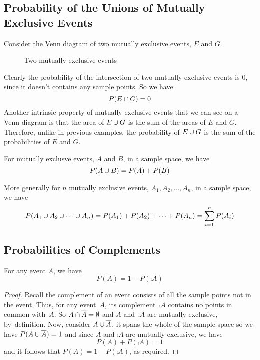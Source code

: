 \subsection*{Probability of the Unions of Mutually Exclusive Events}
Consider the Venn diagram of two mutually exclusive events, $E$ and $G$.
\begin{figure}[htp]
\centering
{}
\caption{Two mutually exclusive events} \label{fig:Two mutually exclusive events}
\end{figure}
Clearly the probability of the intersection of two mutually exclusive events is 0, since it doesn't contains any sample points. So we have 
\[
    P(E \cap G) = 0    
\]
Another intrinsic property of mutually exclusive events that we can see on a Venn diagram is that the area of $E \cup G$ is the sum of the areas of $E$ and $G$. Therefore, unlike in previous examples, the probability of $E \cup G$ is the sum of the probabilities of $E$ and $G$.
\begin{theorem}
For mutually exclusve events, $A$ and $B$, in a sample space, we have
\[
    P(A \cup B) = P(A) + P(B)
\]
\end{theorem}
\begin{theorem}
More generally for $n$ mutually exclusive events, $A_1,A_2,\ldots,A_n$, in a sample space, we have
\[
    P(A_1 \cup A_2 \cup \cdots \cup A_n) = P(A_1) + P(A_2) + \cdots + P(A_n) = \sum_{i = 1}^{n} P(A_i)
\]
\end{theorem}
\subsection*{Probabilities of Complements}
\begin{theorem}
For any event $A$, we have
\[
    P(A) = 1 - P(\comp{A})
\]
\end{theorem}
\begin{proof}
Recall the complement of an event consists of all the sample points not in the event. Thus, for any event~$A$, its complement~$\comp{A}$ contains no points in common with~$A$. So $A \cap \overline{A} = \emptyset$ and $A$ and~$\comp{A}$ are mutually exclusive, by~definition. Now, consider $A \cup \overline{A}$, it spans the whole of the sample space so we have $P(A \cup \overline{A}) = 1$ and since $A$ and $\comp{A}$ are mutually exclusive, we have
\[
    P(A) + P(\comp{A}) = 1
\]
and it follows that $P(A) = 1 - P(\comp{A})$, as required.
\end{proof}
